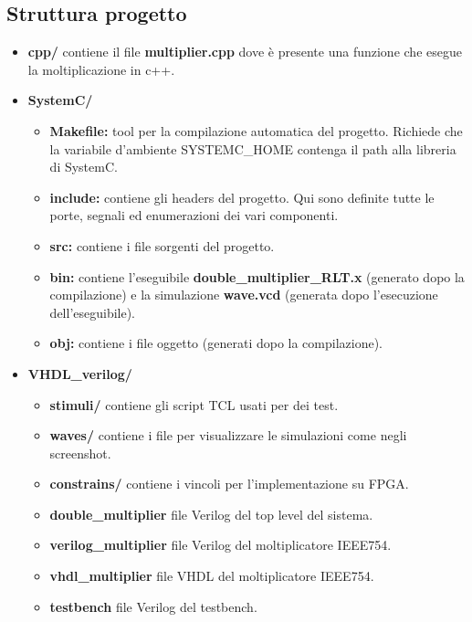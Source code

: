\documentclass[]{IEEEtran}
\begin{document}
\subsection{Struttura progetto}
\begin{itemize}
    \item \textbf{cpp/} contiene il file \textbf{multiplier.cpp} dove è presente una funzione che esegue la moltiplicazione in c++.
    \item \textbf{SystemC/}
          \begin{itemize}
              \item \textbf{Makefile:} tool per la compilazione automatica del progetto. Richiede che la variabile d'ambiente SYSTEMC\_HOME contenga il path alla libreria di SystemC.
              \item \textbf{include:} contiene gli headers del progetto. Qui sono definite tutte le porte, segnali ed enumerazioni dei vari componenti.
              \item \textbf{src:} contiene i file sorgenti del progetto.
              \item \textbf{bin:} contiene l'eseguibile \textbf{double\_multiplier\_RLT.x} (generato dopo la compilazione) e la simulazione \textbf{wave.vcd} (generata dopo l'esecuzione dell'eseguibile).
              \item \textbf{obj:} contiene i file oggetto (generati dopo la compilazione).
          \end{itemize}
    \item \textbf{VHDL\_verilog/}
          \begin{itemize}
              \item \textbf{stimuli/} contiene gli script TCL usati per dei test.
              \item \textbf{waves/} contiene i file per visualizzare le simulazioni come negli screenshot.
              \item \textbf{constrains/} contiene i vincoli per l'implementazione su FPGA.
              \item \textbf{double\_multiplier} file Verilog del top level del sistema.
              \item \textbf{verilog\_multiplier} file Verilog del moltiplicatore IEEE754.
              \item \textbf{vhdl\_multiplier} file VHDL del moltiplicatore IEEE754.
              \item \textbf{testbench} file Verilog del testbench.
          \end{itemize}
\end{itemize}
\end{document}

